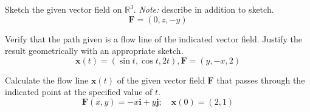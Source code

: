 \documentclass[boxes]{gsypset}
\begin{document}
\begin{problem}[3.3.9]
	Sketch the given vector field on $\mathbb{R}^3$.
	\textit{Note:} describe in addition to sketch.
	\[
		\mathbf{F}=(0,z,-y)
	\]
\end{problem}
\begin{solution}
	
\end{solution}

\begin{problem}[3.3.18]
	Verify that the path given is a flow line of the indicated vector field. 
	Justify the result geometrically with an appropriate sketch.
	\[
		\mathbf{x}(t)=(\sin t,\cos t,2t),\mathbf{F}=(y,-x,2)
	\]
\end{problem}
\begin{solution}
	
\end{solution}


\begin{problem}[3.3.20]
	Calculate the flow line $\mathbf{x}(t)$ of the given vector field $\mathbf{F}$
	that passes through the indicated point at the specified value of $t$.
	\[
		\mathbf{F}(x,y)=-x\mathbf{i}+y\mathbf{j};\quad\mathbf{x}(0)=(2,1)
	\]
\end{problem}
\begin{solution}
	
\end{solution}
\end{document}
